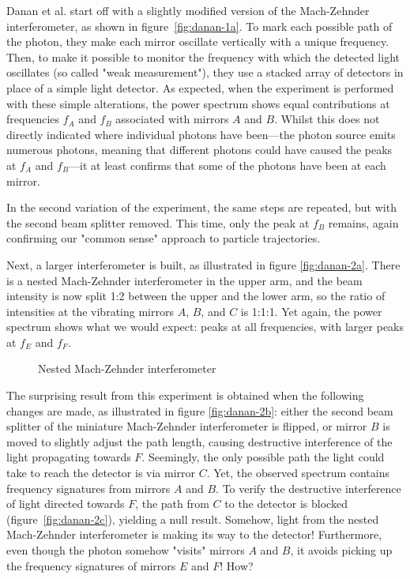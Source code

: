 \documentclass{article}
\begin{document}
Danan et al. start off with a slightly modified version of the Mach-Zehnder 
interferometer, as shown in figure~\ref{fig:danan-1a}. To mark each possible 
path of the photon, they make each mirror oscillate vertically with a unique 
frequency. Then, to make it possible to monitor the frequency with which the 
detected light oscillates (so called "weak measurement"), they use a stacked 
array of detectors in place of a simple light detector. As expected, when the 
experiment is performed with these simple alterations, the power spectrum shows 
equal contributions at frequencies $f_A$ and $f_B$ associated with mirrors $A$ 
and $B$. Whilst this does not directly indicated where individual photons have 
been---the photon source emits numerous photons, meaning that different photons 
could have caused the peaks at $f_A$ and $f_B$---it at least confirms that some 
of the photons have been at each mirror. 

In the second variation of the experiment, the same steps are repeated, but 
with the second beam splitter removed. This time, only the peak at $f_B$ 
remains, again confirming our "common sense" approach to particle trajectories. 

Next, a larger interferometer is built, as illustrated in figure 
\ref{fig:danan-2a}. There is a nested Mach-Zehnder interferometer in the upper 
arm, and the beam intensity is now split 1:2 between the upper and the lower 
arm, so the ratio of intensities at the vibrating mirrors $A$, $B$, and $C$ is 
1:1:1.  Yet again, the power spectrum shows what we would expect: peaks at all 
frequencies, with larger peaks at $f_E$ and $f_F$. 

 \begin{figure}
	\subfloat[]{\label{fig:danan-2a}}
	\subfloat[]{\label{fig:danan-2b}}
	\newline
	\hspace*{\fill}
	\subfloat[]{\label{fig:danan-2c}}
	\hspace*{\fill}
	\caption{Nested Mach-Zehnder interferometer}
	\label{fig:danan}
\end{figure}


The surprising result from this experiment is obtained when the following 
changes are made, as illustrated in figure \ref{fig:danan-2b}:
either the second beam splitter of the miniature Mach-Zehnder interferometer is 
flipped, or mirror $B$ is moved to slightly adjust the path length, causing 
destructive interference of the light propagating towards $F$. Seemingly, the 
only possible path the light could take to reach the detector is via mirror 
$C$. Yet, the observed spectrum contains frequency signatures from mirrors $A$ 
and $B$. To verify the destructive interference of light directed towards $F$, 
the path from $C$ to the detector is blocked (figure~\ref{fig:danan-2c}), 
yielding a null result. Somehow, light from the nested Mach-Zehnder 
interferometer is making its way to the detector! Furthermore, even though the 
photon somehow "visits" mirrors $A$ and $B$, it avoids picking up the frequency 
signatures of mirrors $E$ and $F$! How? 
\end{document}
